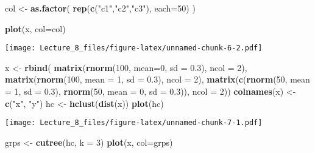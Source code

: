 \documentclass[]{article}
\newenvironment{Shaded}{\begin{snugshade}}{\end{snugshade}}
\newcommand{\DataTypeTok}[1]{\textcolor[rgb]{0.13,0.29,0.53}{#1}}
\newcommand{\DecValTok}[1]{\textcolor[rgb]{0.00,0.00,0.81}{#1}}
\newcommand{\FloatTok}[1]{\textcolor[rgb]{0.00,0.00,0.81}{#1}}
\newcommand{\KeywordTok}[1]{\textcolor[rgb]{0.13,0.29,0.53}{\textbf{#1}}}
\newcommand{\NormalTok}[1]{#1}
\newcommand{\StringTok}[1]{\textcolor[rgb]{0.31,0.60,0.02}{#1}}
\begin{document}
\begin{Shaded}
\begin{Highlighting}[]
\NormalTok{col <-}\StringTok{ }\KeywordTok{as.factor}\NormalTok{( }\KeywordTok{rep}\NormalTok{(}\KeywordTok{c}\NormalTok{(}\StringTok{"c1"}\NormalTok{,}\StringTok{"c2"}\NormalTok{,}\StringTok{"c3"}\NormalTok{), }\DataTypeTok{each=}\DecValTok{50}\NormalTok{) )}

\KeywordTok{plot}\NormalTok{(x, }\DataTypeTok{col=}\NormalTok{col)}
\end{Highlighting}
\end{Shaded}

\texttt{[image: Lecture\_8\_files/figure-latex/unnamed-chunk-6-2.pdf]}

\begin{Shaded}
\begin{Highlighting}[]
\NormalTok{x <-}\StringTok{ }\KeywordTok{rbind}\NormalTok{(}
\KeywordTok{matrix}\NormalTok{(}\KeywordTok{rnorm}\NormalTok{(}\DecValTok{100}\NormalTok{, }\DataTypeTok{mean=}\DecValTok{0}\NormalTok{, }\DataTypeTok{sd =} \FloatTok{0.3}\NormalTok{), }\DataTypeTok{ncol =} \DecValTok{2}\NormalTok{), }
\KeywordTok{matrix}\NormalTok{(}\KeywordTok{rnorm}\NormalTok{(}\DecValTok{100}\NormalTok{, }\DataTypeTok{mean =} \DecValTok{1}\NormalTok{, }\DataTypeTok{sd =} \FloatTok{0.3}\NormalTok{), }\DataTypeTok{ncol =} \DecValTok{2}\NormalTok{), }
\KeywordTok{matrix}\NormalTok{(}\KeywordTok{c}\NormalTok{(}\KeywordTok{rnorm}\NormalTok{(}\DecValTok{50}\NormalTok{, }\DataTypeTok{mean =} \DecValTok{1}\NormalTok{, }\DataTypeTok{sd =} \FloatTok{0.3}\NormalTok{), }
        \KeywordTok{rnorm}\NormalTok{(}\DecValTok{50}\NormalTok{, }\DataTypeTok{mean =} \DecValTok{0}\NormalTok{, }\DataTypeTok{sd =} \FloatTok{0.3}\NormalTok{)), }\DataTypeTok{ncol =} \DecValTok{2}\NormalTok{))}
\KeywordTok{colnames}\NormalTok{(x) <-}\StringTok{ }\KeywordTok{c}\NormalTok{(}\StringTok{"x"}\NormalTok{, }\StringTok{"y"}\NormalTok{)}
\NormalTok{hc <-}\StringTok{ }\KeywordTok{hclust}\NormalTok{(}\KeywordTok{dist}\NormalTok{(x))}
\KeywordTok{plot}\NormalTok{(hc)}
\end{Highlighting}
\end{Shaded}

\texttt{[image: Lecture\_8\_files/figure-latex/unnamed-chunk-7-1.pdf]}

\begin{Shaded}
\begin{Highlighting}[]
\NormalTok{grps <-}\StringTok{ }\KeywordTok{cutree}\NormalTok{(hc, }\DataTypeTok{k =} \DecValTok{3}\NormalTok{)}
\KeywordTok{plot}\NormalTok{(x, }\DataTypeTok{col=}\NormalTok{grps)}
\end{Highlighting}
\end{Shaded}
\end{document}
